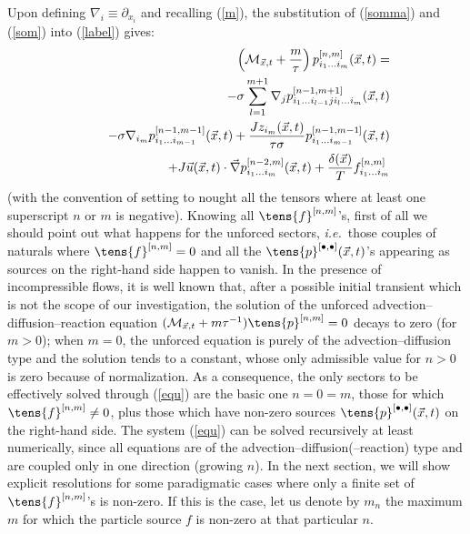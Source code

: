Upon defining $\nabla_i\equiv\partial_{x_i}$ and recalling (\ref{m}), the substitution of (\ref{somma}) and (\ref{som}) into (\ref{label}) gives:
\begin{eqnarray} \label{equ}
 &&\left(\mathcal{M}_{\vec{x},t}+\frac{m}{\tau}\right)p^{[n,m]}_{i_1\ldots i_m}(\vec{x},t)=\nonumber\\
 &&\quad-\sigma\sum_{l=1}^{m+1}\nabla_jp^{[n-1,m+1]}_{i_1\ldots i_{l-1}ji_l\ldots i_m}(\vec{x},t)\nonumber\\
 &&\quad-\sigma\nabla_{i_m}p^{[n-1,m-1]}_{i_1\ldots i_{m-1}}(\vec{x},t)+\frac{Jz_{i_m}(\vec{x},t)}{\tau\sigma}p^{[n-1,m-1]}_{i_1\ldots i_{m-1}}(\vec{x},t)\nonumber\\
 &&\quad+J\vec{u}(\vec{x},t)\cdot\vec{\nabla}p^{[n-2,m]}_{i_1\ldots i_m}(\vec{x},t)+\frac{\delta(\vec{x})}{T}f^{[n,m]}_{i_1\ldots i_m}
\end{eqnarray}
(with the convention of setting to nought all the tensors where at least one superscript $n$ or $m$ is negative).
Knowing all $\tens{f}^{[n,m]}$'s, first of all we should point out what happens for the unforced sectors,
\emph{i.e.}\ those couples of naturals where $\tens{f}^{[n,m]}=0$ and all the $\tens{p}^{[\bullet,\bullet]}(\xt)$'s
appearing as sources on the right-hand side happen to vanish.
In the presence of incompressible flows, it is well known that, after a possible initial transient which is
not the scope of our investigation, the solution of the unforced advection--diffusion--reaction equation
$(\mathcal{M}_{\xt}+m\tau^{-1})\tens{p}^{[n,m]}=0$ decays to zero (for $m>0$); when $m=0$, the unforced
equation is purely of the advection--diffusion type and the solution tends to a constant, whose only admissible value
for $n>0$ is zero because of normalization. As a consequence, the only sectors to be effectively
solved through (\ref{equ}) are the basic one $n=0=m$, those for which $\tens{f}^{[n,m]}\neq0$,
plus those which have non-zero sources $\tens{p}^{[\bullet,\bullet]}(\xt)$ on the right-hand side.
The system (\ref{equ}) can be solved recursively at least numerically,
since all equations are of the advection--diffusion(--reaction) type and are coupled only in one direction (growing $n$).
In the next section, we will show explicit resolutions for some
paradigmatic cases where only a finite set of $\tens{f}^{[n,m]}$'s is non-zero.
If this is the case, let us denote by $m_n$ the maximum $m$ for which the particle source $f$ is non-zero at that particular $n$.

